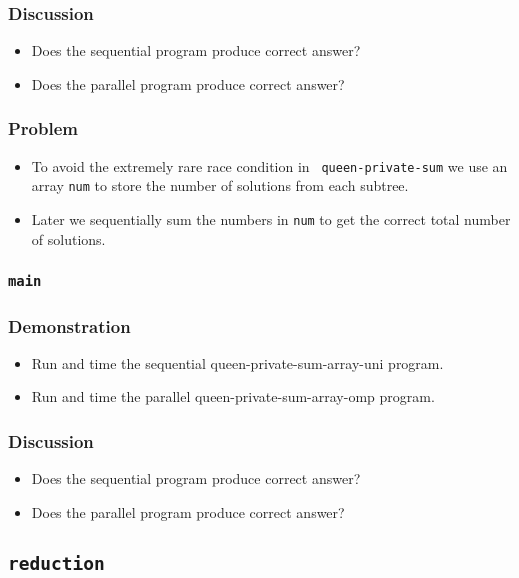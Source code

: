\documentclass{beamer}
\begin{document}
\begin{frame}
\frametitle{Discussion}
\begin{itemize}
\item Does the sequential program produce correct answer?
\item Does the parallel program produce correct answer?
\end{itemize}
\end{frame}



\begin{frame}
\frametitle{Problem}
\begin{itemize}
\item To avoid the extremely rare race condition in {\tt
  queen-private-sum} we use an array {\tt num} to store the number of
  solutions from each subtree.
\item Later we sequentially sum the numbers in {\tt num} to get the
  correct total number of solutions.
\end{itemize}
\end{frame}


\begin{frame}
\frametitle{\tt main} 
\end{frame}

\begin{frame}
\frametitle{Demonstration}
\begin{itemize}
\item Run and time the sequential queen-private-sum-array-uni program.
\item Run and time the parallel queen-private-sum-array-omp program.
\end{itemize}
\end{frame}

\begin{frame}
\frametitle{Discussion}
\begin{itemize}
\item Does the sequential program produce correct answer?
\item Does the parallel program produce correct answer?
\end{itemize}
\end{frame}

\subsection{\tt reduction}
\end{document}
